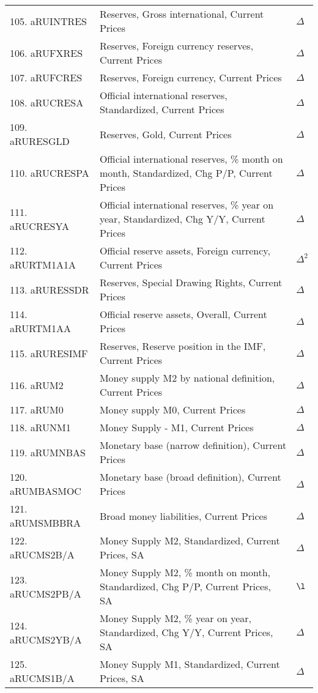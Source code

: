 \documentclass[a4paper, 14pt]{article}
\begin{document}
\begin{center}
\begin{longtable}{p{5.5cm} p{10cm} p{0.15cm}}
	105. aRUINTRES &  Reserves, Gross international, Current Prices & $\Delta$\\
	106. aRUFXRES &  Reserves, Foreign currency reserves, Current Prices & $\Delta$\\
	107. aRUFCRES &  Reserves, Foreign currency, Current Prices & $\Delta$\\
	108. aRUCRESA &  Official international reserves, Standardized, Current Prices & $\Delta$\\
	109. aRURESGLD &  Reserves, Gold, Current Prices & $\Delta$\\
	110. aRUCRESPA &  Official international reserves, \% month on month, Standardized, Chg P/P, Current Prices & $\Delta$\\
	111. aRUCRESYA &  Official international reserves, \% year on year, Standardized, Chg Y/Y, Current Prices & $\Delta$\\
	112. aRURTM1A1A &  Official reserve assets, Foreign currency, Current Prices & $\Delta^2$\\
	113. aRURESSDR &  Reserves, Special Drawing Rights, Current Prices & $\Delta$\\
	114. aRURTM1AA &  Official reserve assets, Overall, Current Prices & $\Delta$\\
	115. aRURESIMF &  Reserves, Reserve position in the IMF, Current Prices & $\Delta$\\
	116. aRUM2 &  Money supply M2 by national definition, Current Prices & $\Delta$\\
	117. aRUM0 &  Money supply M0, Current Prices & $\Delta$\\
	118. aRUNM1 &  Money Supply - M1, Current Prices & $\Delta$\\
	119. aRUMNBAS &  Monetary base (narrow definition), Current Prices & $\Delta$\\
	120. aRUMBASMOC &  Monetary base (broad definition), Current Prices & $\Delta$\\
	121. aRUMSMBBRA &  Broad money liabilities, Current Prices & $\Delta$\\
	122. aRUCMS2B/A &  Money Supply M2, Standardized, Current Prices, SA & $\Delta$\\
	123. aRUCMS2PB/A &  Money Supply M2, \% month on month, Standardized, Chg P/P, Current Prices, SA & $\l$\\
	124. aRUCMS2YB/A &  Money Supply M2, \% year on year, Standardized, Chg Y/Y, Current Prices, SA & $\Delta$\\
	125. aRUCMS1B/A &  Money Supply M1, Standardized, Current Prices, SA & $\Delta$\\

\end{longtable}
\end{center}
\end{document}
